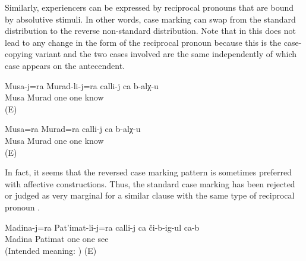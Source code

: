 Similarly, experiencers can be expressed by reciprocal pronouns that are bound by absolutive stimuli. In other words, case marking can swap from the standard distribution to the reverse non-standard distribution. Note that in  this does not lead to any change in the form of the reciprocal pronoun because this is the case-copying variant and the two cases involved are the same independently of which case appears on the antecendent.
%
\begin{exe}
	\ex	\label{ex:Musa and Murad know each other}
	\begin{xlist}
		\ex	\label{ex:Musa and Murad know each other@A}
		\gll	Musa-j=ra	Murad-li-j=ra	calli-j	ca	b-alχ-u\\
			Musa	Murad	one	one	know\\
		\glt	{} (E)

		\ex	\label{ex:Musa and Murad know each other@B}
		\gll	Musa=ra	Murad=ra	calli-j	ca	b-alχ-u\\
			Musa\tsc{=add}	Murad	one	one	know\\
		\glt	{} (E)
	\end{xlist}
\end{exe}

In fact, it seems that the reversed case marking pattern is sometimes preferred with affective constructions. Thus, the standard case marking has been rejected or judged as very marginal for a similar clause with the same type of reciprocal pronoun .
%
\begin{exe}
	\ex	\label{ex:Madina and Patimat see each other uncertain@14}
		Madina-j=ra	Pat'imat-li-j=ra	calli-j	ca	či-b-ig-ul	ca-b\\
		{}	Madina	Patimat	one	one	see	\\
	\glt	(Intended meaning: ) (E)
\end{exe}

